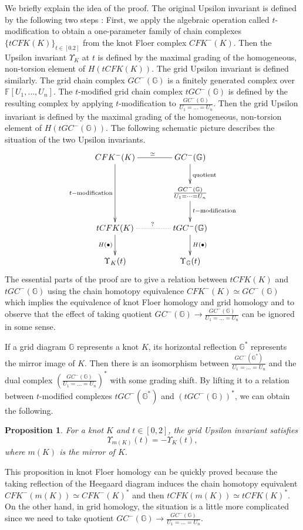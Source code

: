 \documentclass[12pt]{amsart}
\theoremstyle{plain}
\theoremstyle{definition}
\theoremstyle{plain}
\newtheorem{prop}[thm]{Proposition}
\theoremstyle{definition}
\newcommand{\G}{\mathbb{G}}
\numberwithin{equation}{section}
\begin{document}
We briefly explain the idea of the proof.
The original Upsilon invariant is defined by the following two steps \cite{Concordance-homomorphisms-from-knot-Floer-homology}:
First, we apply the algebraic operation called $t$-modification to obtain a one-parameter family of chain complexes $\{tCFK(K)\}_{t\in[0.2]}$ from the knot Floer complex $CFK^-(K)$.
Then the Upsilon invariant $\Upsilon_K$ at $t$ is defined by the maximal grading of the homogeneous, non-torsion element of $H(tCFK(K))$.
The grid Upsilon invariant is defined similarly.
The grid chain complex $GC^-(\G)$ is a finitely generated complex over $\mathbb{F}[U_1,\dots,U_n]$.
The $t$-modified grid chain complex $tGC^-(\G)$ is defined by the resulting complex by applying $t$-modification to $\frac{GC^-(\G)}{U_1=\dots=U_n}$.
Then the grid Upsilon invariant is defined by the maximal grading of the homogeneous, non-torsion element of $H(tGC^-(\G))$.
The following schematic picture describes the situation of the two Upsilon invariants.
\[
\xymatrix@C=40pt{
CFK^-(K)\ar[dd]_{t\mathrm{-modification}}\ar@{-}[r]^{\simeq} & GC^-(\G)\ar[d]^{\mathrm{quotient}} \\
{} & \frac{GC^-(\G)}{U_1=\dots=U_n}\ar[d]^{t\mathrm{-modification}} \\
tCFK(K) \ar[d]_{H(\bullet)} \ar@{.}[r]^? & tGC^-(\G)\ar[d]^{H(\bullet)} \\
\Upsilon_K(t) & \Upsilon_\G(t)
}
\]
The essential parts of the proof are to give a relation between $tCFK(K)$ and $tGC^-(\G)$ using the chain homotopy equivalence $CFK^-(K)\simeq GC^-(\G)$ which implies the equivalence of knot Floer homology and grid homology and to observe that the effect of taking quotient $GC^-(\G)\to\frac{GC^-(\G)}{U_1=\dots=U_n}$ can be ignored in some sense.

If a grid diagram $\G$ represents a knot $K$, its horizontal reflection $\G^*$ represents the mirror image of $K$.
Then there is an isomorphism between $\frac{GC^-(\G^*)}{U_1=\dots=U_n}$ and the dual complex $(\frac{GC^-(\G)}{U_1=\dots=U_n})^*$ with some grading shift.
By lifting it to a relation between $t$-modified complexes $tGC^-(\G^*)$ and $(tGC^-(\G))^*$, we can obtain the following.
\begin{prop}
\label{prop:mirror}
For a knot $K$ and $t\in[0,2]$, the grid Upsilon invariant satisfies
\[
\Upsilon_{m(K)}(t)=-\Upsilon_K(t),
\]
where $m(K)$ is the mirror of $K$.
\end{prop}
This proposition in knot Floer homology can be quickly proved because the taking reflection of the Heegaard diagram induces the chain homotopy equivalent $CFK^-(m(K))\simeq CFK^-(K)^*$ and then $tCFK(m(K))\simeq tCFK(K)^*$.
On the other hand, in grid homology, the situation is a little more complicated since we need to take quotient $GC^-(\G)\to\frac{GC^-(\G)}{U_1=\dots=U_n}$.
\end{document}
